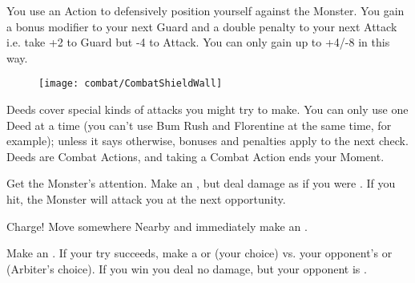 \begin{multicols*}{2}
  \COMBAT [
    Name = Warding,
    Link = combat-tactical-maneuver-warding,
    Desc = Brawl weapons only
  ]


  You use an Action to defensively position yourself against the Monster.  You gain a bonus modifier to your next Guard \RO and a double penalty to your next Attack \RO i.e. take +2 to Guard but -4 to Attack. You can only gain up to +4/-8 in this way.

\begin{figure*}
\begin{center}
\texttt{[image: combat/CombatShieldWall]}
\end{center}
\end{figure*}


\newpage






  Deeds cover special kinds of attacks you might try to make. You can only use one Deed at a time (you can't use Bum Rush and Florentine at the same time, for example); unless it says otherwise, bonuses and penalties apply to the next \RO check. Deeds are Combat Actions, and taking a Combat Action ends your Moment.

  \COMBAT [
    Name = Bash,
    Link = combat-deeds-bash,
    Desc = Must have a shield equipped (it has to be on your arm / you have to be using it)
  ]

  Get the Monster's attention.  Make an , but deal damage as if you were . If you hit, the Monster will attack you at the next opportunity.


  \COMBAT [
    Name = Bum Rush,
    Link = combat-deeds-bum-rush,
    Desc = Must be attacking with a \VIG Brawl weapon
  ]

  Charge!  Move somewhere Nearby and immediately make an .

  \COMBAT [
    Name = Disarm,
    Link = combat-deeds-disarm,
    Desc = Brawl weapons only. Your target must be using a 1-handed weapon
  ]

  Make an .  If your try succeeds, make a \RBONE{\VIG} or \RBONE{\DEX} (your choice) vs. your opponent's \VIG or \DEX (Arbiter's choice). If you win you deal no damage, but your opponent is .



\end{multicols*}
